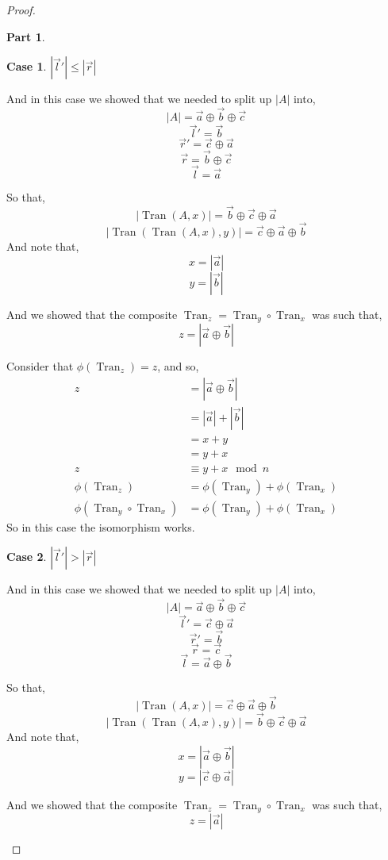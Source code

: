 \documentclass[12pt]{book}
\theoremstyle{plain}
\theoremstyle{definition}
\theoremstyle{ppart}
\newtheorem{ppart}{Part}
\theoremstyle{case}
\newtheorem{case}{Case}
\theoremstyle{solution}
\DeclareMathOperator{\Tran}{Tran}
\newcommand{\shape}[1]{\left|#1\right|}
\begin{document}
\begin{proof}
\begin{ppart}
\setcounter{case}{0}
\begin{case} $\shape{\vec{l}'} \le \shape{\vec{r}}$

And in this case we showed that we needed to split up $\shape{A}$ into,
\[ \shape{A} = \vec{a} \oplus \vec{b} \oplus \vec{c} \]
\[ \vec{l}' = \vec{b} \]
\[ \vec{r}' = \vec{c} \oplus \vec{a} \]
\[ \vec{r} = \vec{b} \oplus \vec{c} \]
\[ \vec{l} = \vec{a} \]

So that,
\[ \shape{\Tran(A, x)} = \vec{b} \oplus \vec{c} \oplus \vec{a} \]
\[ \shape{\Tran(\Tran(A, x), y)} = \vec{c} \oplus \vec{a} \oplus \vec{b} \]
And note that,
\[ x = \shape{\vec{a}} \]
\[ y = \shape{\vec{b}} \]

And we showed that the composite $\Tran_z = \Tran_y \circ \Tran_x$ was such
that,
\[ z = \shape{\vec{a} \oplus \vec{b}} \]

Consider that $\phi(\Tran_z) = z$, and so,
\begin{align*}
  z
  &= \shape{\vec{a} \oplus \vec{b}} \\
  &= \shape{\vec{a}} + \shape{\vec{b}} \\
  &= x + y \\
  &= y + x \\
  z &\equiv y + x \mod n \\
  \phi(\Tran_z) &= \phi(\Tran_y) + \phi(\Tran_x) \\
  \phi(\Tran_y \circ \Tran_x) &= \phi(\Tran_y) + \phi(\Tran_x)
\end{align*}
So in this case the isomorphism works.
\end{case}

\begin{case} $\shape{\vec{l}'} > \shape{\vec{r}}$

And in this case we showed that we needed to split up $\shape{A}$ into,
\[ \shape{A} = \vec{a} \oplus \vec{b} \oplus \vec{c} \]
\[ \vec{l}' = \vec{c} \oplus \vec{a} \]
\[ \vec{r}' = \vec{b} \]
\[ \vec{r} = \vec{c} \]
\[ \vec{l} = \vec{a} \oplus \vec{b} \]

So that,
\[ \shape{\Tran(A, x)} = \vec{c} \oplus \vec{a} \oplus \vec{b} \]
\[ \shape{\Tran(\Tran(A, x), y)} = \vec{b} \oplus \vec{c} \oplus \vec{a} \]
And note that,
\[ x = \shape{\vec{a} \oplus \vec{b}} \]
\[ y = \shape{\vec{c} \oplus \vec{a}} \]

And we showed that the composite $\Tran_z = \Tran_y \circ \Tran_x$ was such
that,
\[ z = \shape{\vec{a}} \]


\end{case}
\end{ppart}
\end{proof}
\end{document}

